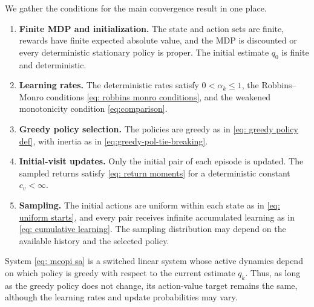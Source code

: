 We gather the conditions for the main convergence result in one place.

\begin{assumption}
\label{asp: standing}
\phantom{Assume}
\begin{enumerate}[label=(\arabic*)]
\item \textbf{Finite MDP and initialization.} The state and action sets are finite, rewards have finite expected absolute value, and the MDP is discounted or every deterministic stationary policy is proper. The initial estimate $q_0$ is finite and deterministic.
\item \textbf{Learning rates.} The deterministic rates satisfy $0<\alpha_k\le1$, the Robbins--Monro conditions \eqref{eq: robbins monro conditions}, and the weakened monotonicity condition \eqref{eq:comparison}.
\item \textbf{Greedy policy selection.} The policies are greedy as in \eqref{eq: greedy policy def}, with inertia as in \eqref{eq:greedy-pol-tie-breaking}.
\item \textbf{Initial-visit updates.} Only the initial pair of each episode is updated. The sampled returns satisfy \eqref{eq: return moments} for a deterministic constant $c_v<\infty$.
\item \textbf{Sampling.} The initial actions are uniform within each state as in \eqref{eq: uniform starts}, and every pair receives infinite accumulated learning as in \eqref{eq: cumulative learning}. The sampling distribution may depend on the available history and the selected policy.
\end{enumerate}
\end{assumption}

System \eqref{eq: mcopi sa} is a switched linear system whose active dynamics depend on which policy is greedy with respect to the current estimate $q_k$.
Thus, as long as the greedy policy does not change, its action-value target remains the same, although the learning rates and update probabilities may vary.





